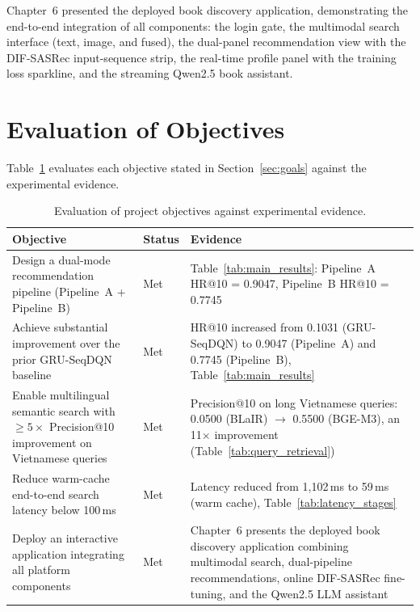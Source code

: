 Chapter~6 presented the deployed book discovery application, demonstrating the end-to-end integration of all components: the login gate, the multimodal search interface (text, image, and fused), the dual-panel recommendation view with the DIF-SASRec input-sequence strip, the real-time profile panel with the training loss sparkline, and the streaming Qwen2.5 book assistant.


\section{Evaluation of Objectives}
\label{sec:conclusion_objectives}

Table~\ref{tab:objectives} evaluates each objective stated in Section~\ref{sec:goals} against the experimental evidence.

\begin{table}[H]
\centering
\caption{Evaluation of project objectives against experimental evidence.}
\label{tab:objectives}
\begin{tabular}{p{5.8cm} p{2.2cm} p{5.5cm}}
\hline
\textbf{Objective} & \textbf{Status} & \textbf{Evidence} \\
\hline
Design a dual-mode recommendation pipeline (Pipeline~A + Pipeline~B) &
Met &
Table~\ref{tab:main_results}: Pipeline~A HR@10 = 0.9047, Pipeline~B HR@10 = 0.7745 \\

Achieve substantial improvement over the prior GRU-SeqDQN baseline &
Met &
HR@10 increased from 0.1031 (GRU-SeqDQN) to 0.9047 (Pipeline~A) and 0.7745 (Pipeline~B), Table~\ref{tab:main_results} \\

Enable multilingual semantic search with $\geq 5\times$ Precision@10 improvement on Vietnamese queries &
Met &
Precision@10 on long Vietnamese queries: 0.0500 (BLaIR) $\to$ 0.5500 (BGE-M3), an 11$\times$ improvement (Table~\ref{tab:query_retrieval}) \\

Reduce warm-cache end-to-end search latency below 100\,ms &
Met &
Latency reduced from 1{,}102\,ms to 59\,ms (warm cache), Table~\ref{tab:latency_stages} \\

Deploy an interactive application integrating all platform components &
Met &
Chapter~6 presents the deployed book discovery application combining multimodal search, dual-pipeline recommendations, online DIF-SASRec fine-tuning, and the Qwen2.5 LLM assistant \\
\hline
\end{tabular}
\end{table}

